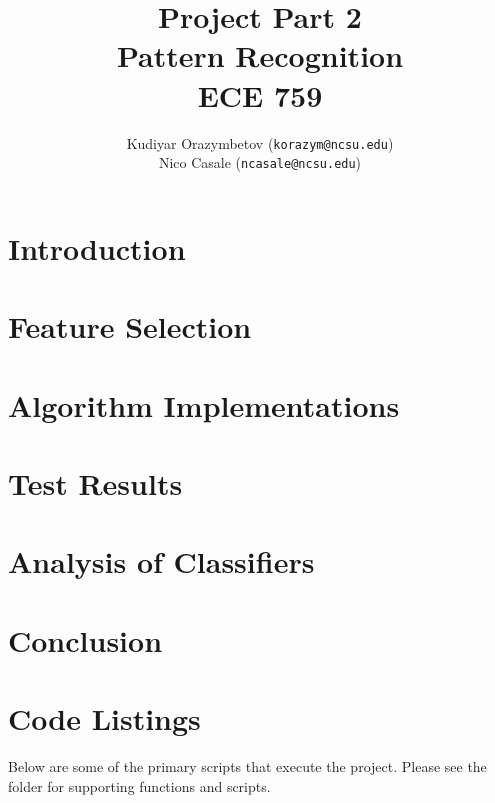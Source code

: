 \documentclass[]{ncmathy}
\newcommand{\theassignment}{Project Part 2}
\newcommand{\thecourse}{Pattern Recognition\\ECE 759}
\begin{document}
\title{\theassignment\\\thecourse}
\author{Kudiyar Orazymbetov (\texttt{korazym@ncsu.edu})\\Nico Casale (\texttt{ncasale@ncsu.edu})}

\makeFancyTitle
\setcounter{tocdepth}{2}
\tableofcontents
\pagebreak
\chead{} %
\makeatletter
\let\@starttoc\@multitoc@starttoc
\listoffigures
\listoftables
\lstlistoflistings
\makeatother
\pagebreak
\chead{\textcolor{Red}\thesection :\ \textcolor{Red}\leftmark}

\section{Introduction} 
	

\section{Feature Selection}
	

\section{Algorithm Implementations}
	
        
	

\section{Test Results}
	

\section{Analysis of Classifiers}
	

\section{Conclusion}
	




\section{Code Listings}

Below are some of the primary scripts that execute the project. Please see the
 folder for supporting functions and scripts.




%

%
\end{document}
